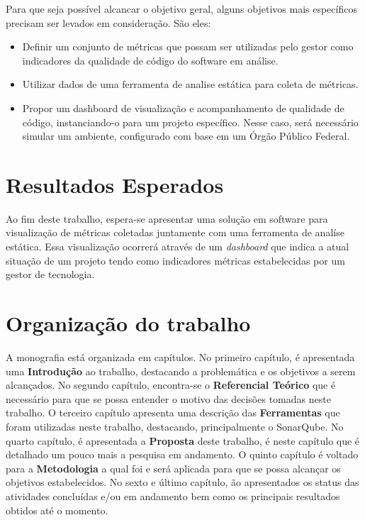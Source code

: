 	Para que seja possível alcancar o objetivo geral, alguns objetivos mais específicos precisam ser levados em consideração. São eles:
		 
	\begin{itemize}
		\item Definir um conjunto de métricas que possam ser utilizadas pelo gestor como indicadores da qualidade de código do software em análise.
		\item Utilizar dados de uma ferramenta de analise estática para coleta de métricas.  
		\item Propor um dashboard de visualização e acompanhamento de qualidade de código, instanciando-o para um projeto específico. Nesse caso, será necessário simular um ambiente, configurado com base em um Órgão Público Federal.
		
	\end{itemize}
	
	
	\section{Resultados Esperados}

Ao fim deste trabalho, espera-se apresentar uma solução em software para visualização de métricas coletadas  juntamente com uma ferramenta de analíse estática. Essa visualização ocorrerá através de um \textit{dashboard} que indica a atual situação de um projeto tendo como indicadores métricas estabelecidas por um gestor de tecnologia. 

	\section{Organização do trabalho} %
	\label{sec:organização_do_trabalho} 	
A monografia está organizada em capítulos. No primeiro capítulo, é apresentada uma \textbf{Introdução} ao trabalho, destacando a problemática e os objetivos a serem alcançados. No segundo capítulo, encontra-se o \textbf{Referencial Teórico} que é necessário para que se possa entender o motivo das decisões tomadas neste trabalho. O terceiro capítulo apresenta uma descrição das \textbf{Ferramentas} que foram utilizadas neste trabalho, destacando, principalmente o SonarQube. No quarto capítulo, é apresentada a \textbf{Proposta} deste trabalho, é neste capítulo que é detalhado um pouco mais a pesquisa em andamento. O quinto capítulo é voltado para a \textbf{Metodologia} a qual foi e será aplicada para que se possa alcançar os objetivos estabelecidos. No sexto e último capítulo, ão apresentados os status das atividades concluídas e/ou em andamento bem como os principais resultados obtidos até o momento.
